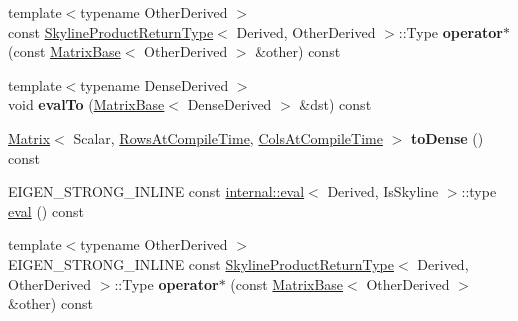 \begin{DoxyCompactItemize}
\item 
\mbox{\label{class_eigen_1_1_skyline_matrix_base_a6f7465d4e34f77cdcc396acd0b1dbbf5}} 
{\footnotesize template$<$typename Other\+Derived $>$ }\\const \hyperlink{struct_eigen_1_1_skyline_product_return_type}{Skyline\+Product\+Return\+Type}$<$ Derived, Other\+Derived $>$\+::Type {\bfseries operator$\ast$} (const \hyperlink{group___core___module_class_eigen_1_1_matrix_base}{Matrix\+Base}$<$ Other\+Derived $>$ \&other) const
\item 
\mbox{\label{class_eigen_1_1_skyline_matrix_base_a9053e6aa219a3e23d0044de7301a8e8d}} 
{\footnotesize template$<$typename Dense\+Derived $>$ }\\void {\bfseries eval\+To} (\hyperlink{group___core___module_class_eigen_1_1_matrix_base}{Matrix\+Base}$<$ Dense\+Derived $>$ \&dst) const
\item 
\mbox{\label{class_eigen_1_1_skyline_matrix_base_a2fd454562f9f3517bedeb606ff42f3ef}} 
\hyperlink{group___core___module_class_eigen_1_1_matrix}{Matrix}$<$ Scalar, \hyperlink{class_eigen_1_1_skyline_matrix_base_a811ba3961cb927ae5fa84ed278ebceeaa22b71b821112b0ccf61b7317b9ac4cf4}{Rows\+At\+Compile\+Time}, \hyperlink{class_eigen_1_1_skyline_matrix_base_a811ba3961cb927ae5fa84ed278ebceeaa0bb8b9ae248b86ca53aff754311111e8}{Cols\+At\+Compile\+Time} $>$ {\bfseries to\+Dense} () const
\item 
E\+I\+G\+E\+N\+\_\+\+S\+T\+R\+O\+N\+G\+\_\+\+I\+N\+L\+I\+NE const \hyperlink{struct_eigen_1_1internal_1_1eval}{internal\+::eval}$<$ Derived, Is\+Skyline $>$\+::type \hyperlink{class_eigen_1_1_skyline_matrix_base_a03d2346d1bc95c63405e03b6a39d2f7e}{eval} () const
\item 
\mbox{\label{class_eigen_1_1_skyline_matrix_base_a71fe620d0a5043dd5aff05c5d7fb10c6}} 
{\footnotesize template$<$typename Other\+Derived $>$ }\\E\+I\+G\+E\+N\+\_\+\+S\+T\+R\+O\+N\+G\+\_\+\+I\+N\+L\+I\+NE const \hyperlink{struct_eigen_1_1_skyline_product_return_type}{Skyline\+Product\+Return\+Type}$<$ Derived, Other\+Derived $>$\+::Type {\bfseries operator$\ast$} (const \hyperlink{group___core___module_class_eigen_1_1_matrix_base}{Matrix\+Base}$<$ Other\+Derived $>$ \&other) const
\end{DoxyCompactItemize}

